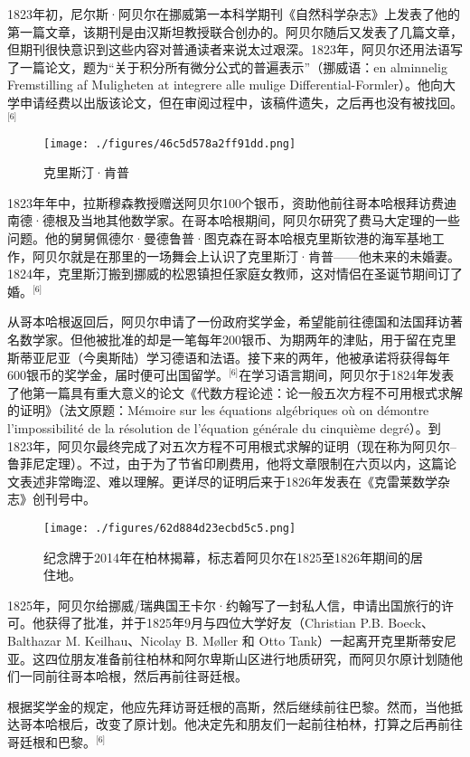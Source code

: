 1823年初，尼尔斯·阿贝尔在挪威第一本科学期刊《自然科学杂志》上发表了他的第一篇文章，该期刊是由汉斯坦教授联合创办的。阿贝尔随后又发表了几篇文章，但期刊很快意识到这些内容对普通读者来说太过艰深。1823年，阿贝尔还用法语写了一篇论文，题为“关于积分所有微分公式的普遍表示”（挪威语：en alminnelig Fremstilling af Muligheten at integrere alle mulige Differential-Formler）。他向大学申请经费以出版该论文，但在审阅过程中，该稿件遗失，之后再也没有被找回。\(^\text{[6]}\)
\begin{figure}[ht]
\centering
\texttt{[image: ./figures/46c5d578a2ff91dd.png]}
\caption{克里斯汀·肯普} \label{fig_NRSAB_3}
\end{figure}
1823年年中，拉斯穆森教授赠送阿贝尔100个银币，资助他前往哥本哈根拜访费迪南德·德根及当地其他数学家。在哥本哈根期间，阿贝尔研究了费马大定理的一些问题。他的舅舅佩德尔·曼德鲁普·图克森在哥本哈根克里斯钦港的海军基地工作，阿贝尔就是在那里的一场舞会上认识了克里斯汀·肯普——他未来的未婚妻。1824年，克里斯汀搬到挪威的松恩镇担任家庭女教师，这对情侣在圣诞节期间订了婚。\(^\text{[6]}\)

从哥本哈根返回后，阿贝尔申请了一份政府奖学金，希望能前往德国和法国拜访著名数学家。但他被批准的却是一笔每年200银币、为期两年的津贴，用于留在克里斯蒂亚尼亚（今奥斯陆）学习德语和法语。接下来的两年，他被承诺将获得每年600银币的奖学金，届时便可出国留学。\(^\text{[6]}\)在学习语言期间，阿贝尔于1824年发表了他第一篇具有重大意义的论文《代数方程论述：论一般五次方程不可用根式求解的证明》（法文原题：Mémoire sur les équations algébriques où on démontre l'impossibilité de la résolution de l'équation générale du cinquième degré）。到1823年，阿贝尔最终完成了对五次方程不可用根式求解的证明（现在称为阿贝尔–鲁菲尼定理）。不过，由于为了节省印刷费用，他将文章限制在六页以内，这篇论文表述非常晦涩、难以理解。更详尽的证明后来于1826年发表在《克雷莱数学杂志》创刊号中。
\begin{figure}[ht]
\centering
\texttt{[image: ./figures/62d884d23ecbd5c5.png]}
\caption{纪念牌于2014年在柏林揭幕，标志着阿贝尔在1825至1826年期间的居住地。} \label{fig_NRSAB_4}
\end{figure}
1825年，阿贝尔给挪威/瑞典国王卡尔·约翰写了一封私人信，申请出国旅行的许可。他获得了批准，并于1825年9月与四位大学好友（Christian P.B. Boeck、Balthazar M. Keilhau、Nicolay B. Møller 和 Otto Tank）一起离开克里斯蒂安尼亚。这四位朋友准备前往柏林和阿尔卑斯山区进行地质研究，而阿贝尔原计划随他们一同前往哥本哈根，然后再前往哥廷根。

根据奖学金的规定，他应先拜访哥廷根的高斯，然后继续前往巴黎。然而，当他抵达哥本哈根后，改变了原计划。他决定先和朋友们一起前往柏林，打算之后再前往哥廷根和巴黎。\(^\text{[6]}\)
